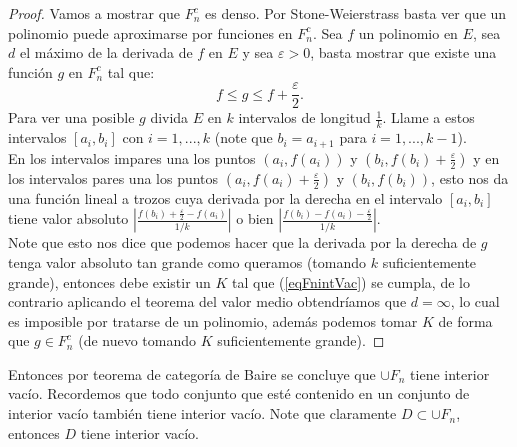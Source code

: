 \documentclass{article}
\theoremstyle{definition}
\begin{document}
\begin{proof}
Vamos a mostrar que $F_n^c$ es denso. Por Stone-Weierstrass basta ver que un polinomio puede aproximarse por funciones en $F_n^c$. Sea $f$ un polinomio en $E$, sea $d$ el máximo de la derivada de $f$ en $E$ y sea $\varepsilon>0$, basta mostrar que existe una función $g$ en $F_n^c$ tal que:
\begin{equation}\label{eqFnintVac}
f\leq g\leq f+\frac{\varepsilon}{2}.
\end{equation}
Para ver una posible $g$ divida $E$ en $k$ intervalos de longitud $\frac{1}{k}$. Llame a estos intervalos $[a_i,b_i]$ con $i=1,...,k$ (note que $b_i=a_{i+1}$ para $i=1,...,k-1$).\\
En los intervalos impares una los puntos $(a_i,f(a_i))$ y $(b_i,f(b_i)+\frac{\varepsilon}{2})$ y en los intervalos pares una los puntos $(a_i,f(a_i)+\frac{\varepsilon}{2})$ y $(b_i,f(b_i))$, esto nos da una función lineal a trozos cuya derivada por la derecha en el intervalo $[a_i,b_i]$ tiene valor absoluto $\left|\frac{f(b_i)+\frac{\varepsilon}{2}-f(a_i)}{1/k}\right|$    
o bien $\left|\frac{f(b_i)-f(a_i)-\frac{\varepsilon}{2}}{1/k}\right|$.    \\
Note que esto nos dice que podemos hacer que la derivada por la derecha de $g$ tenga valor absoluto tan grande como queramos (tomando $k$ suficientemente grande), entonces debe existir un $K$ tal que (\ref{eqFnintVac}) se cumpla, de lo contrario aplicando el teorema del valor medio obtendríamos que $d=\infty$, lo cual es imposible por tratarse de un polinomio, además podemos tomar $K$ de forma que $g\in F_n^c$ (de nuevo tomando $K$ suficientemente grande). 




\end{proof}


Entonces por teorema de categoría de Baire se concluye que $\cup F_n$ tiene interior vacío.
Recordemos que todo conjunto que esté contenido en un conjunto de interior vacío también tiene interior vacío. Note que claramente $D\subset \cup F_n$, entonces $D$ tiene interior vacío.
\end{document}
